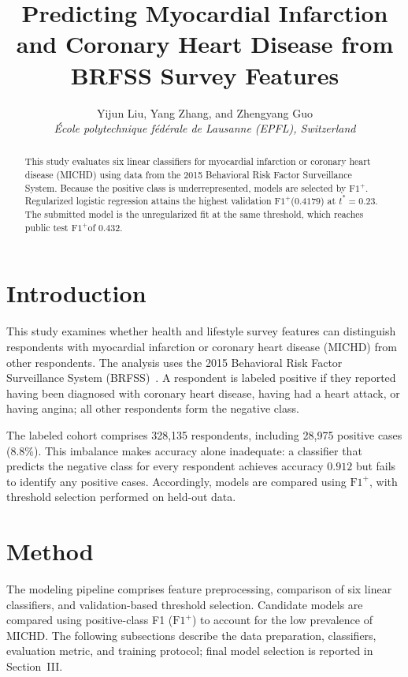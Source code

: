 \documentclass[10pt,conference,compsocconf]{IEEEtran}
\newcommand{\Fp}{\ensuremath{\mathrm{F1}^{+}}}
\begin{document}
\title{Predicting Myocardial Infarction and Coronary Heart Disease from BRFSS Survey Features}

\author{
  Yijun Liu, Yang Zhang, and Zhengyang Guo\\
  \textit{\'{E}cole polytechnique f\'{e}d\'{e}rale de Lausanne (EPFL), Switzerland}
}

\maketitle

\begin{abstract}
This study evaluates six linear classifiers for myocardial infarction or coronary heart disease (MICHD) using data from the 2015 Behavioral Risk Factor Surveillance System. Because the positive class is underrepresented, models are selected by \Fp. Regularized logistic regression attains the highest validation \Fp ($0.4179$) at $t^\ast=0.23$. The submitted model is the unregularized fit at the same threshold, which reaches public test \Fp of $0.432$.
\end{abstract}

\section{Introduction}

This study examines whether health and lifestyle survey features can distinguish respondents with myocardial infarction or coronary heart disease (MICHD) from other respondents. The analysis uses the 2015 Behavioral Risk Factor Surveillance System (BRFSS)~\cite{brfss2015,aicrowd_p1}. A respondent is labeled positive if they reported having been diagnosed with coronary heart disease, having had a heart attack, or having angina; all other respondents form the negative class.

The labeled cohort comprises 328{,}135 respondents, including 28{,}975 positive cases (8.8\%). This imbalance makes accuracy alone inadequate: a classifier that predicts the negative class for every respondent achieves accuracy $0.912$ but fails to identify any positive cases. Accordingly, models are compared using \Fp, with threshold selection performed on held-out data.

\section{Method}

The modeling pipeline comprises feature preprocessing, comparison of six linear classifiers, and validation-based threshold selection. Candidate models are compared using positive-class F1 (\Fp) to account for the low prevalence of MICHD. The following subsections describe the data preparation, classifiers, evaluation metric, and training protocol; final model selection is reported in Section~III.
\end{document}
